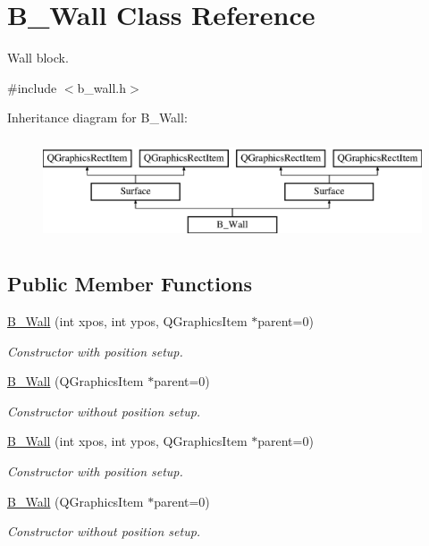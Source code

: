 \hypertarget{class_b___wall}{}\section{B\+\_\+\+Wall Class Reference}
\label{class_b___wall}


Wall block.  




{\ttfamily \#include $<$b\+\_\+wall.\+h$>$}

Inheritance diagram for B\+\_\+\+Wall\+:\begin{figure}[H]
\begin{center}
\leavevmode
\includegraphics[height=3.000000cm]{class_b___wall}
\end{center}
\end{figure}
\subsection*{Public Member Functions}
\begin{DoxyCompactItemize}
\item 
\hyperlink{class_b___wall_ad83db8883f6d620be7f9430b962c5774}{B\+\_\+\+Wall} (int xpos, int ypos, Q\+Graphics\+Item $\ast$parent=0)
\begin{DoxyCompactList}\small\item\em Constructor with position setup. \end{DoxyCompactList}\item 
\hyperlink{class_b___wall_a04cf7394644c9ca59a21e0e4dc1e63a6}{B\+\_\+\+Wall} (Q\+Graphics\+Item $\ast$parent=0)
\begin{DoxyCompactList}\small\item\em Constructor without position setup. \end{DoxyCompactList}\item 
\hyperlink{class_b___wall_ad83db8883f6d620be7f9430b962c5774}{B\+\_\+\+Wall} (int xpos, int ypos, Q\+Graphics\+Item $\ast$parent=0)
\begin{DoxyCompactList}\small\item\em Constructor with position setup. \end{DoxyCompactList}\item 
\hyperlink{class_b___wall_a04cf7394644c9ca59a21e0e4dc1e63a6}{B\+\_\+\+Wall} (Q\+Graphics\+Item $\ast$parent=0)
\begin{DoxyCompactList}\small\item\em Constructor without position setup. \end{DoxyCompactList}\end{DoxyCompactItemize}


